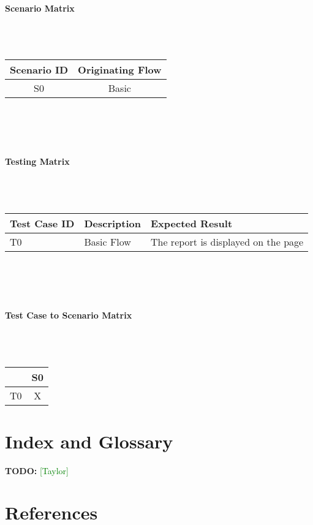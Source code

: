 \documentclass{article}
\newcommand{\taylor}{\textcolor{green}{[Taylor]}}
\begin{document}
\paragraph{Scenario Matrix}~\\ \\
\begin{tabular}{ c  c }
\hline
Scenario ID & Originating Flow \\
\hline
\hline
S0 & Basic \\
\hline
\end{tabular}\\
~\\
~\\
\paragraph{Testing Matrix}~\\ \\
\begin{tabular}{ p{1.0in}  p{2.1in}  p{2.2in} }
\hline
Test Case ID & Description & Expected Result\\
\hline
\hline
T0 & Basic Flow & The report is displayed on the page\\
\hline
\end{tabular}\\
~\\
~\\
\paragraph{Test Case to Scenario Matrix}~\\ \\
\begin{tabular}{ | c || c | }
\hline
    & S0 \\
\hline
\hline
T0 & X  \\
\hline

\end{tabular}
\section{Index and Glossary}
\textbf{TODO:} \taylor

\section{References}
\end{document}
